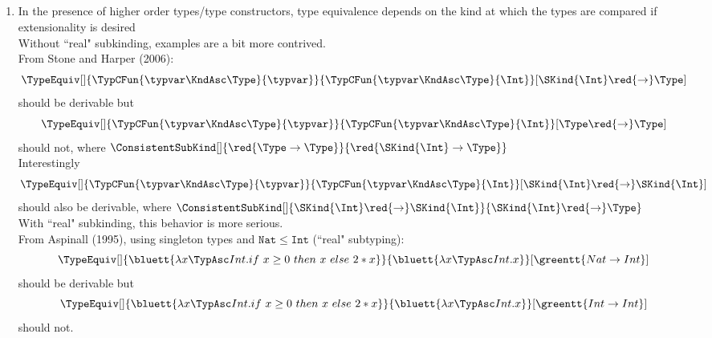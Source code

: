 \documentclass[12pt,fleqn]{article}
\begin{document}
    \subsection*{}
    \begin{enumerate}[label=Nibwm \arabic*:]
        \item In the presence of higher order types/type constructors, type equivalence depends on the kind at which the types are compared if extensionality is desired \\
            Without ``real" subkinding, examples are a bit more contrived. \\
            From Stone and Harper (2006): \\
            \[
                \TypeEquiv[]{\TypCFun{\typvar\KndAsc\Type}{\typvar}}{\TypCFun{\typvar\KndAsc\Type}{\Int}}[\SKind{\Int} \red{\rightarrow} \Type]
            \]
            should be derivable but
            \[
                \TypeEquiv[]{\TypCFun{\typvar\KndAsc\Type}{\typvar}}{\TypCFun{\typvar\KndAsc\Type}{\Int}}[\Type \red{\rightarrow} \Type]
            \]
            should not, where $\ConsistentSubKind[]{\red{\Type \rightarrow \Type}}{\red{\SKind{\Int} \rightarrow \Type}}$ \\
            Interestingly
            \[
                \TypeEquiv[]{\TypCFun{\typvar\KndAsc\Type}{\typvar}}{\TypCFun{\typvar\KndAsc\Type}{\Int}}[\SKind{\Int} \red{\rightarrow} \SKind{\Int}]
            \]
            should also be derivable, where $\ConsistentSubKind[]{\SKind{\Int} \red{\rightarrow} \SKind{\Int}}{\SKind{\Int} \red{\rightarrow} \Type}$ \\
            With ``real" subkinding, this behavior is more serious. \\
            From Aspinall (1995), using singleton types and $\mathtt{Nat \le Int}$ (``real" subtyping):
            \[
                \TypeEquiv[]{\bluett{\lambda x\TypAsc Int.if~x \ge 0~then~x~else~2*x}}{\bluett{\lambda x\TypAsc Int.x}}[\greentt{Nat \rightarrow Int}]
            \]
            should be derivable but
            \[
                \TypeEquiv[]{\bluett{\lambda x\TypAsc Int.if~x \ge 0~then~x~else~2*x}}{\bluett{\lambda x\TypAsc Int.x}}[\greentt{Int \rightarrow Int}]
            \]
            should not.
    \end{enumerate}
\newpage
    
    
\end{document}

